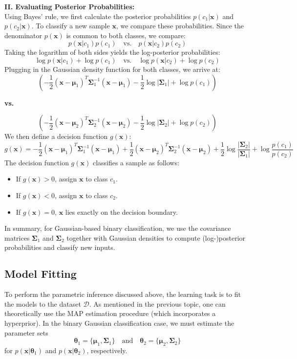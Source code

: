 \documentclass[12pt]{article}
\begin{document}
\textbf{II. Evaluating Posterior Probabilities:} \\
Using Bayes' rule, we first calculate the posterior probabilities \(p(c_1 | \bm{x})\) and \(p(c_2 | \bm{x})\). To classify a new sample \(\bm{x}\), we compare these probabilities. Since the denominator \(p(\bm{x})\) is common to both classes, we compare:
\begin{equation}
p(\bm{x} | c_1) p(c_1) \quad \text{vs.} \quad p(\bm{x} | c_2) p(c_2)
\end{equation}
Taking the logarithm of both sides yields the log-posterior probabilities:
\begin{equation}
\log p(\bm{x} | c_1) + \log p(c_1) \quad \text{vs.} \quad \log p(\bm{x} | c_2) + \log p(c_2)
\end{equation}
Plugging in the Gaussian density function for both classes, we arrive at:
\[
\left( -\frac{1}{2}(\bm{x} - \bm{\mu}_1)^T \bm{\Sigma}_1^{-1} (\bm{x} - \bm{\mu}_1) - \frac{1}{2}\log |\bm{\Sigma}_1| + \log p(c_1) \right)
\]
\begin{center}\textbf{vs.}\end{center}
\[
\left( -\frac{1}{2}(\bm{x} - \bm{\mu}_2)^T \bm{\Sigma}_2^{-1} (\bm{x} - \bm{\mu}_2) - \frac{1}{2}\log |\bm{\Sigma}_2| + \log p(c_2) \right)
\]
We then define a decision function \(g(\bm{x})\):
\begin{equation}
g(\bm{x}) = -\frac{1}{2}(\bm{x} - \bm{\mu}_1)^T \bm{\Sigma}_1^{-1} (\bm{x} - \bm{\mu}_1) + \frac{1}{2}(\bm{x} - \bm{\mu}_2)^T \bm{\Sigma}_2^{-1} (\bm{x} - \bm{\mu}_2) + \frac{1}{2}\log \frac{|\bm{\Sigma}_2|}{|\bm{\Sigma}_1|} + \log \frac{p(c_1)}{p(c_2)}
\end{equation}
The decision function \(g(\bm{x})\) classifies a sample as follows:
\begin{itemize}
    \item If \(g(\bm{x}) > 0\), assign \(\bm{x}\) to class \(c_1\).
    \item If \(g(\bm{x}) < 0\), assign \(\bm{x}\) to class \(c_2\).
    \item If \(g(\bm{x}) = 0\), \(\bm{x}\) lies exactly on the decision boundary.
\end{itemize}

In summary, for Gaussian-based binary classification, we use the covariance matrices \(\bm{\Sigma}_1\) and \(\bm{\Sigma}_2\) together with Gaussian densities to compute (log-)posterior probabilities and classify new inputs.

\subsection{Model Fitting}
To perform the parametric inference discussed above, the learning task is to fit the models to the dataset \(\mathcal{D}\). As mentioned in the previous topic, one can theoretically use the MAP estimation procedure (which incorporates a hyperprior). In the binary Gaussian classification case, we must estimate the parameter sets
\[
\bm{\theta}_1 = \{ \bm{\mu}_1, \bm{\Sigma}_1 \} \quad \text{and} \quad \bm{\theta}_2 = \{ \bm{\mu}_2, \bm{\Sigma}_2 \}
\]
for \(p(\bm{x}|\bm{\theta}_1)\) and \(p(\bm{x}|\bm{\theta}_2)\), respectively.
\end{document}

